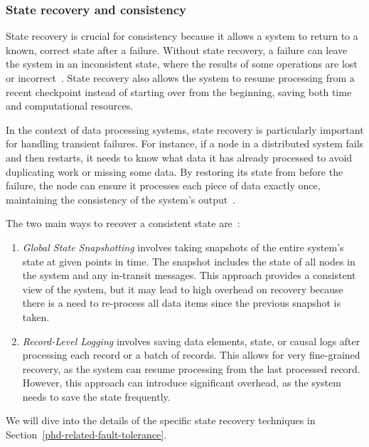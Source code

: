 \subsubsection{State recovery and consistency}

State recovery is crucial for consistency because it allows a system to return to a known, correct state after a failure. Without state recovery, a failure can leave the system in an inconsistent state, where the results of some operations are lost or incorrect~\cite{Carbone:2017:SMA:3137765.3137777, Akidau:2013:MFS:2536222.2536229}. State recovery also allows the system to resume processing from a recent checkpoint instead of starting over from the beginning, saving both time and computational resources.

In the context of data processing systems, state recovery is particularly important for handling transient failures. For instance, if a node in a distributed system fails and then restarts, it needs to know what data it has already processed to avoid duplicating work or missing some data. By restoring its state from before the failure, the node can ensure it processes each piece of data exactly once, maintaining the consistency of the system's output~\cite{silvestre2021clonos, Carbone:2017:SMA:3137765.3137777, wang2021consistency}.

The two main ways to recover a consistent state are~\cite{fragkoulis2024survey, zhang2024survey}:

\begin{enumerate}
    \item {\em Global State Snapshotting} involves taking snapshots of the entire system's state at given points in time. The snapshot includes the state of all nodes in the system and any in-transit messages. This approach provides a consistent view of the system, but it may lead to high overhead on recovery because there is a need to re-process all data items since the previous snapshot is taken.
    \item {\em Record-Level Logging} involves saving data elements, state, or causal logs after processing each record or a batch of records. This allows for very fine-grained recovery, as the system can resume processing from the last processed record. However, this approach can introduce significant overhead, as the system needs to save the state frequently.
\end{enumerate}

We will dive into the details of the specific state recovery techniques in Section~\ref{phd-related-fault-tolerance}.

